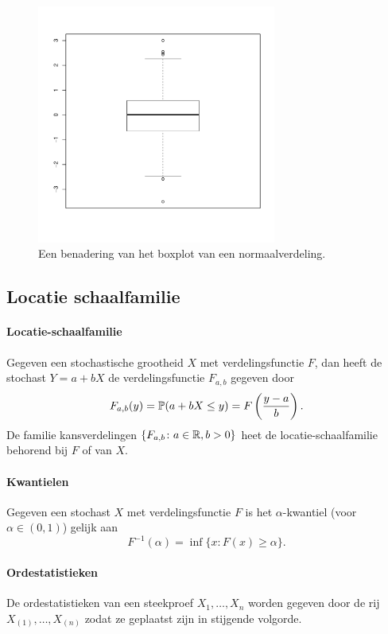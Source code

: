 \begin{figure}[ht]
    \centering
    \includegraphics[width=0.7\textwidth]{plots/data.pdf}
    \caption{Een benadering van het boxplot van een normaalverdeling.}
    \label{fig:boxplot_norm}
\end{figure}

\subsection{Locatie schaalfamilie}
\paragraph{Locatie-schaalfamilie} Gegeven een stochastische grootheid \(X\) met verdelingsfunctie \(F\), dan heeft de stochast \(Y=a+bX\) de verdelingsfunctie \(F_{a,b}\) gegeven door
\[
    F_{a,b}(y)=\mathbb{P}(a+bX\leq y)=F\left(\frac{y-a}{b}\right).
\]
De familie kansverdelingen \(\{F_{a,b}\colon a\in\mathbb{R},b>0\}\) heet de locatie-schaalfamilie behorend bij \(F\) of van \(X\).

\paragraph{Kwantielen} Gegeven een stochast \(X\) met verdelingsfunctie \(F\) is het \(\alpha\)-kwantiel (voor \(\alpha\in(0,1)\)) gelijk aan
\[
    F^{-1}(\alpha)=\inf\{x\colon F(x)\geq\alpha\}.
\]

\paragraph{Ordestatistieken} De ordestatistieken van een steekproef \(X_{1},\dots,X_{n}\) worden gegeven door de rij \(X_{(1)},\dots,X_{(n)}\) zodat ze geplaatst zijn in stijgende volgorde.

